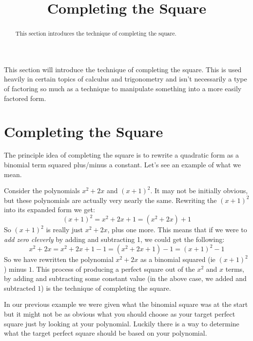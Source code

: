 \documentclass{ximera}
\title{Completing the Square}
\begin{document}
\begin{abstract}
    This section introduces the technique of completing the square.
\end{abstract}
\maketitle

This section will introduce the technique of completing the square. This is used heavily in certain topics of calculus and trigonometry and isn't necessarily a type of factoring so much as a technique to manipulate something into a more easily factored form.


\section*{Completing the Square}
    The principle idea of completing the square is to rewrite a quadratic form as a binomial term squared plus/minus a constant. Let's see an example of what we mean. 
    
    \begin{example}
        Consider the polynomials $x^2 + 2x$ and $(x+1)^2$. It may not be initially obvious, but these polynomials are actually very nearly the same. Rewriting the $(x+1)^2$ into its expanded form we get: 
        \[
            (x+1)^2 = x^2 + 2x + 1 = (x^2 + 2x) + 1
        \]
        So $(x+1)^2$ is really just $x^2 + 2x$, plus one more. This means that if we were to \textit{add zero cleverly} by adding and subtracting 1, we could get the following: 
        \[
            x^2 + 2x = x^2 + 2x + 1 - 1 = (x^2 + 2x + 1) - 1 = (x+1)^2 - 1
        \]
        So we have rewritten the polynomial $x^2 + 2x$ as a binomial squared (ie $(x+1)^2$) minus $1$. This process of producing a perfect square out of the $x^2$ and $x$ terms, by adding and subtracting some constant value (in the above case, we added and subtracted $1$) is the technique of completing the square.
    \end{example}
    
    In our previous example we were given what the binomial square was at the start but it might not be as obvious what you should choose as your target perfect square just by looking at your polynomial. Luckily there is a way to determine what the target perfect square should be based on your polynomial.
    
\end{document}
